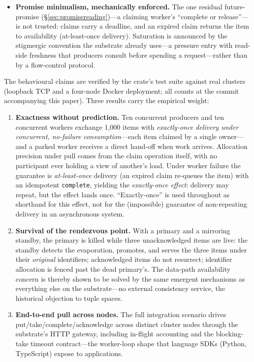 \documentclass[11pt]{article}
\theoremstyle{definition}
\theoremstyle{plain}
\theoremstyle{plain}
\begin{document}
\begin{itemize}
  role on one node), matching the
  designed-in-versus-emergent distinction of \S\ref{sec:emergent}: the
  failover coalition forms from local rules in response to a specific
  event and holds no standing authority over the substrate.
\item \textbf{Promise minimalism, mechanically enforced.} The one residual
  future-promise (\S\ref{sec:promisereading})---a claiming worker's
  ``complete or release''---is not trusted: claims carry a deadline, and
  an expired claim returns the item to availability (at-least-once
  delivery). Saturation is announced by the stigmergic convention the
  substrate already uses---a pressure entry with read-side freshness that
  producers consult before spending a request---rather than by a
  flow-control protocol.
\end{itemize}

The behavioural claims are verified by the crate's test suite against real
clusters (loopback TCP and a four-node Docker deployment; all counts at
the commit accompanying this paper). Three results carry the empirical
weight:

\begin{enumerate}
\item \textbf{Exactness without prediction.} Ten concurrent producers and
  ten concurrent workers exchange 1{,}000 items with \emph{exactly-once delivery
  under concurrent, no-failure consumption}---each item claimed by a single
  owner---and a parked worker receives a direct hand-off when work arrives.
  Allocation precision under pull comes from the claim operation itself, with no
  participant ever holding a view of another's load. Under worker failure the
  guarantee is \emph{at-least-once} delivery (an expired claim re-queues the item)
  with an idempotent \texttt{complete}, yielding the \emph{exactly-once effect}:
  delivery may repeat, but the effect lands once. ``Exactly-once'' is used
  throughout as shorthand for this effect, not for the (impossible) guarantee of
  non-repeating delivery in an asynchronous system.
\item \textbf{Survival of the rendezvous point.} With a primary and a
  mirroring standby, the primary is killed while three unacknowledged
  items are live: the standby detects the evaporation, promotes, and
  serves the three items under their \emph{original} identifiers;
  acknowledged items do not resurrect; identifier allocation is fenced
  past the dead primary's. The data-path availability concern is thereby
  shown to be solved by the same emergent mechanisms as everything else
  on the substrate---no external consistency service, the historical
  objection to tuple spaces.
\item \textbf{End-to-end pull across nodes.} The full integration scenario
  drives put/take/complete/acknowledge across distinct cluster nodes
  through the substrate's HTTP gateway, including in-flight accounting
  and the blocking-take timeout contract---the worker-loop shape that
  language SDKs (Python, TypeScript) expose to applications.
\end{enumerate}
\end{document}
